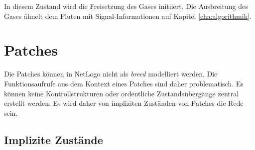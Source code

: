 In diesem Zustand wird die Freisetzung des Gases initiiert. Die Ausbreitung des Gases ähnelt dem Fluten mit Signal-Informationen auf Kapitel \ref{cha:algorithmik}. 

%
%
%
%
%
%


\section{Patches}
\label{sec:patches}

Die Patches können in NetLogo nicht als \emph{breed} modelliert werden. Die Funktionsaufrufe aus dem Kontext eines Patches sind daher problematisch. Es können keine Kontrollstrukturen oder ordentliche Zustandsübergänge zentral erstellt werden. Es wird daher von impliziten Zuständen von Patches die Rede sein.

\subsection{Implizite Zustände}
\label{sec:patch_states}

